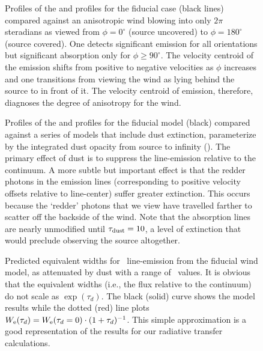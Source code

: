 \documentclass[12pt,preprint]{aastex}
\begin{document}
\begin{figure}
\caption{
Profiles of the  and  profiles for the fiducial
case (black lines) compared against an anisotropic wind blowing into
only $2\pi$ steradians as viewed from $\phi = 0^\circ$ (source
uncovered) to $\phi = 180^\circ$ (source covered).  One detects
significant emission for all orientations but significant
absorption only for $\phi \ge 90^\circ$.
The velocity centroid of the 
emission shifts from positive to negative velocities as $\phi$
increases and one transitions from viewing the wind as lying behind the
source to in front of it.  The velocity centroid of emission, therefore,
diagnoses the degree of anisotropy for the wind.
}
\label{fig:anisotropic}
\end{figure}

\begin{figure}
\caption{
Profiles of the  and  profiles for the fiducial
model (black) compared against a series of models that include 
dust extinction, parameterize by the integrated dust opacity from
source to infinity (\taud).  The primary effect of dust is to suppress 
the line-emission relative to the continuum. 
A more subtle but important effect is that the redder photons in the
emission lines (corresponding to positive velocity offsets relative to
line-center) suffer greater extinction.  
This occurs because the `redder' photons that we view have travelled 
farther to scatter off the backside of the wind.  Note that
the absorption lines are nearly unmodified until $\tau_{\rm dust} = 10$, a
level of extinction that would preclude observing the source
altogether.
}
\label{fig:dust}
\end{figure}

\begin{figure}
\caption{
Predicted equivalent widths for \mgiib\ line-emission from the
fiducial wind model, as attenuated by dust with a range of \taud\
values.  
It is obvious that the equivalent widths (i.e., the flux relative to
the continuum) do not scale as $\exp(\tau_d)$.
The black (solid) curve shows the model results while the
dotted (red) line plots $W_{\rm e}(\tau_d) = W_{\rm e}(\tau_d = 0)
\cdot (1+\tau_d)^{-1}$.  This simple approximation is a good
representation of the results for our radiative transfer calculations.   
}
\label{fig:dust_tau}
\end{figure}
\end{document}
